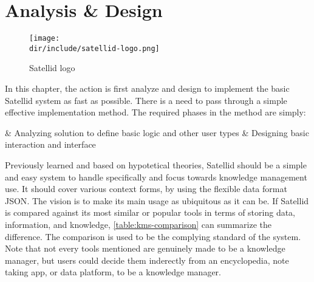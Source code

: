 \chapter{Analysis \& Design}
\label{chap:analysis-design}

\begin{figure}[ht]
  \centering
  \texttt{[image: \\dir/include/satellid-logo.png]}
  \caption{Satellid logo}
  \label{fig:satellid-logo}
\end{figure}

In this chapter, the action is first analyze and design to implement the basic Satellid system as fast as possible.
There is a need to pass through a simple effective implementation method.
The required phases in the method are simply:

\begin{easylist}
& Analyzing solution to define basic logic and other user types
& Designing basic interaction and interface
\end{easylist}

Previously learned and based on hypotetical theories, Satellid should be a simple and easy system to handle specifically and focus towards knowledge management use.
It should cover various context forms, by using the flexible data format \ac{JSON}.
The vision is to make its main usage as ubiquitous as it can be.
If Satellid is compared against its most similar or popular tools in terms of storing data, information, and knowledge, \autoref{table:kms-comparison} can summarize the difference.
The comparison is used to be the complying standard of the system.
Note that not every tools mentioned are genuinely made to be a knowledge manager, but users could decide them inderectly from an encyclopedia, note taking app, or data platform, to be a knowledge manager.

